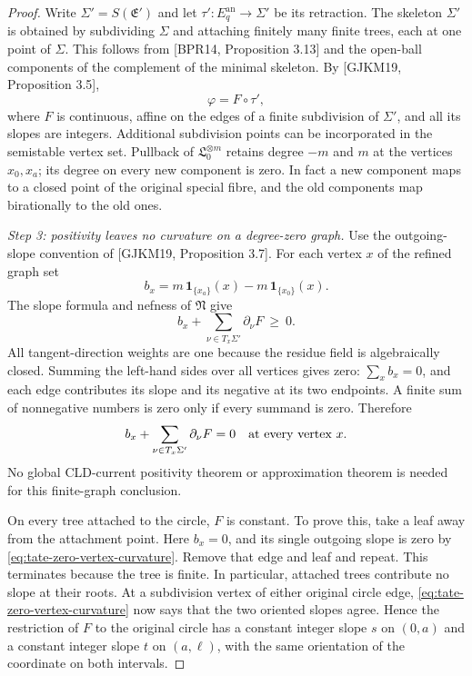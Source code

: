 \begin{proof}
Write \(\Sigma'=S(\mathfrak E')\) and let
\(\tau':E_q^{\mathrm{an}}\to\Sigma'\) be its retraction.
The skeleton \(\Sigma'\) is obtained by subdividing \(\Sigma\) and
attaching finitely many finite trees, each at one point of \(\Sigma\).
This follows from [BPR14, Proposition 3.13] and the open-ball components
of the complement of the minimal skeleton. By
[GJKM19, Proposition 3.5],
\[
 \varphi=F\circ\tau',
\]
where \(F\) is continuous, affine on the edges of a finite subdivision
of \(\Sigma'\), and all its slopes are integers. Additional subdivision
points can be incorporated in the semistable vertex set.
Pullback of \(\mathfrak L_0^{\otimes m}\) retains degree \(-m\) and
\(m\) at the vertices \(x_0,x_a\); its degree on every new component
is zero. In fact a new component maps to a closed point of the original
special fibre, and the old components map birationally to the old ones.

\emph{Step 3: positivity leaves no curvature on a degree-zero graph.}
Use the outgoing-slope convention of [GJKM19, Proposition 3.7]. For
each vertex \(x\) of the refined graph set
\[
 b_x=m\,\mathbf 1_{\{x_a\}}(x)-m\,\mathbf 1_{\{x_0\}}(x).
\]
The slope formula and nefness of \(\mathfrak N\) give
\begin{equation}
\label{eq:tate-nef-vertex-inequality}
 b_x+\sum_{\nu\in T_x\Sigma'}\partial_\nu F\ \geq\ 0.
\end{equation}
All tangent-direction weights are one because the residue field is
algebraically closed. Summing the left-hand sides over all vertices
gives zero: \(\sum_x b_x=0\), and each edge contributes its slope and
its negative at its two endpoints. A finite sum of nonnegative numbers
is zero only if every summand is zero. Therefore
\begin{equation}
\label{eq:tate-zero-vertex-curvature}
 b_x+\sum_{\nu\in T_x\Sigma'}\partial_\nu F=0
 \quad\hbox{at every vertex }x.
\end{equation}
No global CLD-current positivity theorem or approximation theorem is
needed for this finite-graph conclusion.

On every tree attached to the circle, \(F\) is constant. To prove this,
take a leaf away from the attachment point. Here \(b_x=0\), and its
single outgoing slope is zero by
\eqref{eq:tate-zero-vertex-curvature}. Remove that edge and leaf and
repeat. This terminates because the tree is finite. In particular,
attached trees contribute no slope at their roots.
At a subdivision vertex of either original circle edge,
\eqref{eq:tate-zero-vertex-curvature} now says that the two oriented
slopes agree. Hence the restriction of \(F\) to the original circle
has a constant integer slope \(s\) on \((0,a)\) and a constant integer
slope \(t\) on \((a,\ell)\), with the same orientation of the
coordinate on both intervals.


\end{proof}
